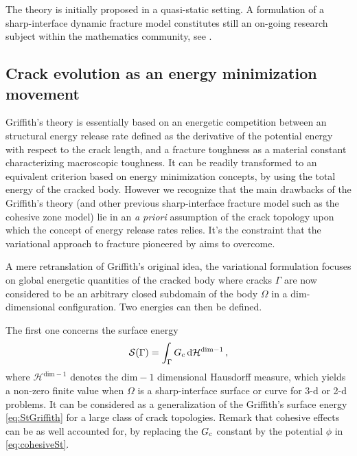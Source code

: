 The theory is initially proposed in a quasi-static setting. A formulation of a sharp-interface dynamic fracture model constitutes still an on-going research subject within the mathematics community, see \cite{Larsen:2010}.

\subsection{Crack evolution as an energy minimization movement} \label{sec:fm98sharp}
Griffith's theory is essentially based on an energetic competition between an structural energy release rate defined as the derivative of the potential energy with respect to the crack length, and a fracture toughness as a material constant characterizing macroscopic toughness. It can be readily transformed to an equivalent criterion based on energy minimization concepts, by using the total energy of the cracked body. However we recognize that the main drawbacks of the Griffith's theory (and other previous sharp-interface fracture model such as the cohesive zone model) lie in an \emph{a priori} assumption of the crack topology upon which the concept of energy release rates relies. It's the constraint that the variational approach to fracture pioneered by \cite{FrancfortMarigo:1998} aims to overcome.

A mere retranslation of Griffith's original idea, the variational formulation focuses on global energetic quantities of the cracked body where cracks $\Gamma$ are now considered to be an arbitrary closed subdomain of the body $\Omega$ in a $\mathrm{dim}$-dimensional configuration. Two energies can then be defined.

The first one concerns the surface energy
\begin{equation} \label{eq:SGamma}
\mathcal{S}(\Gamma)=\int_\Gamma G_\mathrm{c}\,\mathrm{d}\mathcal{H}^{\mathrm{dim}-1}\,,
\end{equation}
where $\mathcal{H}^{\mathrm{dim}-1}$ denotes the $\mathrm{dim}-1$ dimensional Hausdorff measure, which yields a non-zero finite value when $\Omega$ is a sharp-interface surface or curve for 3-d or 2-d problems. It can be considered as a generalization of the Griffith's surface energy \eqref{eq:StGriffith} for a large class of crack topologies. Remark that cohesive effects can be as well accounted for, by replacing the $G_\mathrm{c}$ constant by the potential $\phi$ in \eqref{eq:cohesiveSt}.

